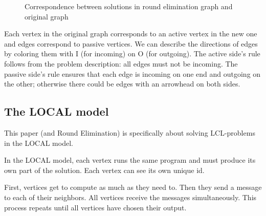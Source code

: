 \documentclass[english, 12pt, a4paper, sci, a-1b, online]{aaltothesis}
\begin{document}
\begin{figure}[h]
\centering
{}
\caption{Correspondence between solutions in round elimination graph and original graph}
\end{figure}

Each vertex in the original graph corresponds to an active vertex in the new one and edges correspond to passive vertices. We can describe the directions of edges by coloring them with I (for incoming) on O (for outgoing). The active side's rule follows from the problem description: all edges must not be incoming. The passive side's rule ensures that each edge is incoming on one end and outgoing on the other; otherwise there could be edges with an arrowhead on both sides.

\subsection{The LOCAL model}

This paper (and Round Elimination) is specifically about solving LCL-problems in the LOCAL model.

In the LOCAL model, each vertex runs the same program and must produce its own part of the solution. Each vertex can see its own unique id.

First, vertices get to compute as much as they need to. Then they send a message to each of their neighbors. All vertices receive the messages simultaneously. This process repeats until all vertices have chosen their output.
\end{document}
